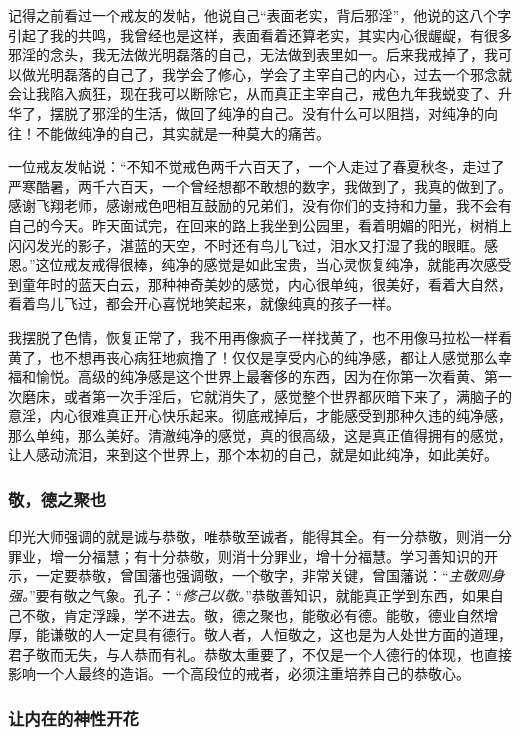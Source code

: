 记得之前看过一个戒友的发帖，他说自己“表面老实，背后邪淫”，他说的这八个字引起了我的共鸣，我曾经也是这样，表面看着还算老实，其实内心很龌龊，有很多邪淫的念头，我无法做光明磊落的自己，无法做到表里如一。后来我戒掉了，我可以做光明磊落的自己了，我学会了修心，学会了主宰自己的内心，过去一个邪念就会让我陷入疯狂，现在我可以断除它，从而真正主宰自己，戒色九年我蜕变了、升华了，摆脱了邪淫的生活，做回了纯净的自己。没有什么可以阻挡，对纯净的向往！不能做纯净的自己，其实就是一种莫大的痛苦。

一位戒友发帖说：“不知不觉戒色两千六百天了，一个人走过了春夏秋冬，走过了严寒酷暑，两千六百天，一个曾经想都不敢想的数字，我做到了，我真的做到了。感谢飞翔老师，感谢戒色吧相互鼓励的兄弟们，没有你们的支持和力量，我不会有自己的今天。昨天面试完，在回来的路上我坐到公园里，看着明媚的阳光，树梢上闪闪发光的影子，湛蓝的天空，不时还有鸟儿飞过，泪水又打湿了我的眼眶。感恩。”这位戒友戒得很棒，纯净的感觉是如此宝贵，当心灵恢复纯净，就能再次感受到童年时的蓝天白云，那种神奇美妙的感觉，内心很单纯，很美好，看着大自然，看着鸟儿飞过，都会开心喜悦地笑起来，就像纯真的孩子一样。

我摆脱了色情，恢复正常了，我不用再像疯子一样找黄了，也不用像马拉松一样看黄了，也不想再丧心病狂地疯撸了！仅仅是享受内心的纯净感，都让人感觉那么幸福和愉悦。高级的纯净感是这个世界上最奢侈的东西，因为在你第一次看黄、第一次磨床，或者第一次手淫后，它就消失了，感觉整个世界都灰暗下来了，满脑子的意淫，内心很难真正开心快乐起来。彻底戒掉后，才能感受到那种久违的纯净感，那么单纯，那么美好。清澈纯净的感觉，真的很高级，这是真正值得拥有的感觉，让人感动流泪，来到这个世界上，那个本初的自己，就是如此纯净，如此美好。

\subsubsection{敬，德之聚也}

印光大师强调的就是诚与恭敬，唯恭敬至诚者，能得其全。有一分恭敬，则消一分罪业，增一分福慧；有十分恭敬，则消十分罪业，增十分福慧。学习善知识的开示，一定要恭敬，曾国藩也强调敬，一个敬字，非常关键，曾国藩说：“\textit{主敬则身强。}”要有敬之气象。孔子：“\textit{修己以敬。}”恭敬善知识，就能真正学到东西，如果自己不敬，肯定浮躁，学不进去。敬，德之聚也，能敬必有德。能敬，德业自然增厚，能谦敬的人一定具有德行。敬人者，人恒敬之，这也是为人处世方面的道理，君子敬而无失，与人恭而有礼。恭敬太重要了，不仅是一个人德行的体现，也直接影响一个人最终的造诣。一个高段位的戒者，必须注重培养自己的恭敬心。

\subsubsection{让内在的神性开花}

